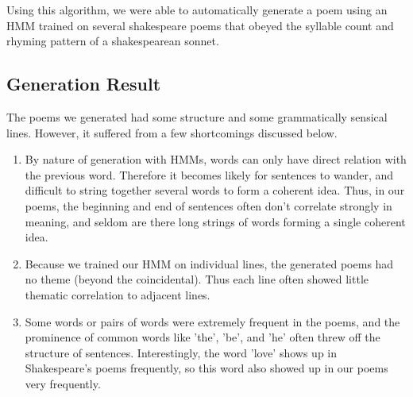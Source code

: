 Using this algorithm, we were able to automatically generate a poem using an HMM trained on several shakespeare poems that obeyed the syllable count and rhyming pattern of a shakespearean sonnet. 

\subsection*{Generation Result}

The poems we generated had some structure and some grammatically sensical lines. However, it suffered from a few shortcomings discussed below.

\begin{enumerate}

\item By nature of generation with HMMs, words can only have direct relation with the previous word. Therefore it becomes likely for sentences to wander, and difficult to string together several words to form a coherent idea. Thus, in our poems, the beginning and end of sentences often don't correlate strongly in meaning, and seldom are there long strings of words forming a single coherent idea. 

\item Because we trained our HMM on individual lines, the generated poems had no theme (beyond the coincidental). Thus each line often showed little thematic correlation to adjacent lines.

\item Some words or pairs of words were extremely frequent in the poems, and the prominence of common words like 'the', 'be', and 'he' often threw off the structure of sentences. Interestingly, the word 'love' shows up in Shakespeare's poems frequently, so this word also showed up in our poems very frequently.

\end{enumerate}

\medskip

